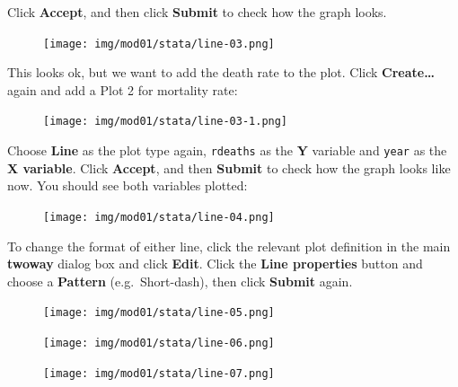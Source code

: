 \documentclass[
  a4paper,
]{memoir}
\begin{document}
Click \textbf{Accept}, and then click \textbf{Submit} to check how the
graph looks.

\begin{figure}[H]

{\centering \texttt{[image: img/mod01/stata/line-03.png]}

}

\end{figure}

This looks ok, but we want to add the death rate to the plot. Click
\textbf{Create\ldots{}} again and add a Plot 2 for mortality rate:

\begin{figure}[H]

{\centering \texttt{[image: img/mod01/stata/line-03-1.png]}

}

\end{figure}

Choose \textbf{Line} as the plot type again, \texttt{rdeaths} as the
\textbf{Y} variable and \texttt{year} as the \textbf{X variable}. Click
\textbf{Accept}, and then \textbf{Submit} to check how the graph looks
like now. You should see both variables plotted:

\begin{figure}[H]

{\centering \texttt{[image: img/mod01/stata/line-04.png]}

}

\end{figure}

To change the format of either line, click the relevant plot definition
in the main \textbf{twoway} dialog box and click \textbf{Edit}. Click
the \textbf{Line properties} button and choose a \textbf{Pattern}
(e.g.~Short-dash), then click \textbf{Submit} again.

\begin{figure}[H]

{\centering \texttt{[image: img/mod01/stata/line-05.png]}

}

\end{figure}

\begin{figure}[H]

{\centering \texttt{[image: img/mod01/stata/line-06.png]}

}

\end{figure}

\begin{figure}[H]

{\centering \texttt{[image: img/mod01/stata/line-07.png]}

}

\end{figure}
\end{document}
